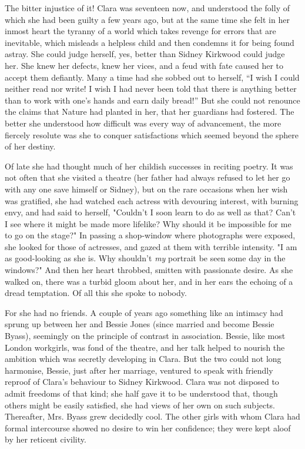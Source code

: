 The bitter injustice of it! Clara was seventeen now, and understood the
folly of which she had been guilty a few years ago, but at the same time
she felt in her inmost heart the tyranny of a world which takes revenge
for errors that are inevitable, which misleads a {}helpless child and
then condemns it for being found astray. She could judge herself, yes,
better than Sidney Kirkwood could judge her. She knew her defects, knew
her vices, and a feud with fate caused her to accept them defiantly.
Many a time had she sobbed out to herself, ``I wish I could neither read
nor write! I wish I had never been told that there is anything better
than to work with one's hands and earn daily bread!'' But she could not
renounce the claims that Nature had planted in her, that her guardians
had fostered. The better she understood how difficult was every way of
advancement, the more fiercely resolute was she to conquer satisfactions
which seemed beyond the sphere of her destiny.

Of late she had thought much of her childish successes in reciting
poetry. It was not often that she visited a theatre (her father had
always refused to let her go with any one save himself or Sidney), but
on the rare occasions when her wish was gratified, she had watched each
actress with devouring interest, with burning envy, and had said to
herself, "Couldn't {}I soon learn to do as well as that? Can't I see
where it might be made more lifelike? Why should it be impossible for me
to go on the stage?" In passing a shop-window where photographs were
exposed, she looked for those of actresses, and gazed at them with
terrible intensity. "I am as good-looking as she is. Why shouldn't
\emph{my} portrait be seen some day in the windows?" And then her heart
throbbed, smitten with passionate desire. As she walked on, there was a
turbid gloom about her, and in her ears the echoing of a dread
temptation. Of all this she spoke to nobody.

For she had no friends. A couple of years ago something like an intimacy
had sprung up between her and Bessie Jones (since married and become
Bessie Byass), seemingly on the principle of contrast in association.
Bessie, like most London workgirls, was fond of the theatre, and her
talk helped to nourish the ambition which was secretly developing in
Clara. But the two could not long harmonise, Bessie, just after her
marriage, ventured to speak with friendly reproof of Clara's {}behaviour
to Sidney Kirkwood. Clara was not disposed to admit freedoms of that
kind; she half gave it to be understood that, though others might be
easily satisfied, she had views of her own on such subjects. Thereafter,
Mrs. Byass grew decidedly cool. The other girls with whom Clara had
formal intercourse showed no desire to win her confidence; they were
kept aloof by her reticent civility.

